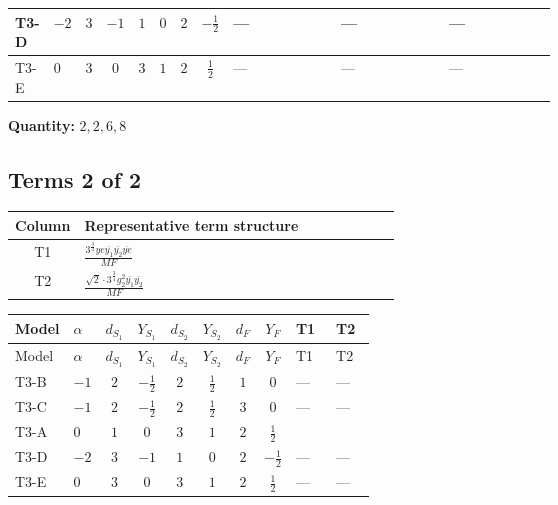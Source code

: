 \documentclass[8pt]{article}
\begin{document}
\begin{landscape}
\begin{longtable}{@{}llcccccc >{\raggedright\arraybackslash}p{0.21\linewidth} >{\raggedright\arraybackslash}p{0.21\linewidth} >{\raggedright\arraybackslash}p{0.21\linewidth}@{}}
\midrule
T3-D & $-2$ & $3$ & $-1$ & $1$ & $0$ & $2$ & $-\frac{1}{2}$ & --- & --- & --- \\
\midrule
T3-E & $0$ & $3$ & $0$ & $3$ & $1$ & $2$ & $\frac{1}{2}$ & --- & --- & --- \\
\midrule
\bottomrule
\end{longtable}
\clearpage
\noindent\textbf{Quantity: }$\mathrm{2,2,6,8}$\par\smallskip
\subsection*{Terms 2 of 2}
\begin{center}
\begin{tabular}{@{}c >{\raggedright\arraybackslash}p{0.82\linewidth}@{}}
\toprule
Column & Representative term structure \\
\midrule
T1 & \(\displaystyle \frac{3^{\frac{3}{4}} ye \overline{y_{1}} \overline{y_{2}} \overline{ye}}{MF}\) \\
\midrule
T2 & \(\displaystyle \frac{\sqrt{2} \cdot 3^{\frac{3}{4}} g_{2}^{2} \overline{y_{1}} \overline{y_{2}}}{MF}\) \\
\midrule
\bottomrule
\end{tabular}
\end{center}
\smallskip
\tiny
\begin{longtable}{@{}llcccccc >{\raggedright\arraybackslash}p{0.21\linewidth} >{\raggedright\arraybackslash}p{0.21\linewidth}@{}}
\toprule
Model & $\alpha$ & $d_{S_1}$ & $Y_{S_1}$ & $d_{S_2}$ & $Y_{S_2}$ & $d_F$ & $Y_F$ & T1 & T2 \\
\midrule
\endfirsthead
\toprule
Model & $\alpha$ & $d_{S_1}$ & $Y_{S_1}$ & $d_{S_2}$ & $Y_{S_2}$ & $d_F$ & $Y_F$ & T1 & T2 \\
\midrule
\endhead
T3-B & $-1$ & $2$ & $-\frac{1}{2}$ & $2$ & $\frac{1}{2}$ & $1$ & $0$ & --- & --- \\
\midrule
T3-C & $-1$ & $2$ & $-\frac{1}{2}$ & $2$ & $\frac{1}{2}$ & $3$ & $0$ & --- & --- \\
\midrule
T3-A & $0$ & $1$ & $0$ & $3$ & $1$ & $2$ & $\frac{1}{2}$ & \scriptsize\adjustbox{max width=\linewidth}{$\begin{gathered} - \frac{3^{\frac{3}{4}} ye \overline{y_{1}} \overline{y_{2}} \overline{ye}}{12 MF}\end{gathered}$} & \scriptsize\adjustbox{max width=\linewidth}{$\begin{gathered} \frac{\sqrt{2} \cdot 3^{\frac{3}{4}} g_{2}^{2} \overline{y_{1}} \overline{y_{2}}}{3 MF}\end{gathered}$} \\
\midrule
T3-D & $-2$ & $3$ & $-1$ & $1$ & $0$ & $2$ & $-\frac{1}{2}$ & --- & --- \\
\midrule
T3-E & $0$ & $3$ & $0$ & $3$ & $1$ & $2$ & $\frac{1}{2}$ & --- & --- \\
\midrule
\bottomrule
\end{longtable}
\clearpage

\end{landscape}
\end{document}
